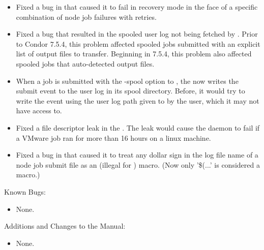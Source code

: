 \begin{itemize}

\item Fixed a bug in  that caused it to fail in recovery
mode in the face of a specific combination of node job failures with
retries.

\item Fixed a bug that resulted in the spooled user log not being
  fetched by .  Prior to Condor 7.5.4, this
  problem affected spooled jobs submitted with an explicit list of
  output files to transfer.  Beginning in 7.5.4, this problem also
  affected spooled jobs that auto-detected output files.

\item When a job is submitted with the -spool option to ,
the  now writes the submit event to the user log in its
spool directory. Before, it would try to write the event using the user
log path given to  by the user, which it may not have
access to.

\item Fixed a file descriptor leak in the . The leak would
cause the daemon to fail if a VMware job ran for more than 16 hours on a
linux machine.

\item Fixed a bug in  that caused it to treat any dollar
sign in the log file name of a node job submit file as an (illegal for
) macro.  (Now only '\$(...' is considered a macro.)

\end{itemize}

\noindent Known Bugs:

\begin{itemize}

\item None.

\end{itemize}

\noindent Additions and Changes to the Manual:

\begin{itemize}

\item None.

\end{itemize}

